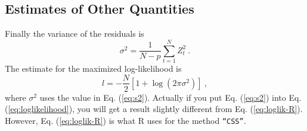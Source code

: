 \subsection{Estimates of  Other Quantities}
Finally the variance of the residuals is
\begin{equation}
\sigma^2 = \frac{1}{N-p}\sum_{t=1}^N Z_t^2\ . \label{eq:s2}
\end{equation}
The estimate for the maximized log-likelihood is 
\begin{equation}
l = -\frac{N}{2}\left[1 + \log(2\pi\sigma^2)\right]\ , \label{eq:loglik-R}
\end{equation}
where $\sigma^2$ uses the value in Eq. (\ref{eq:s2}).
Actually if you put Eq. (\ref{eq:s2}) into
Eq. (\ref{eq:loglikelihood}), you will get a result slightly different
from Eq. (\ref{eq:loglik-R}). However, Eq. (\ref{eq:loglik-R}) is what
R uses for the method \texttt{``CSS''}.

